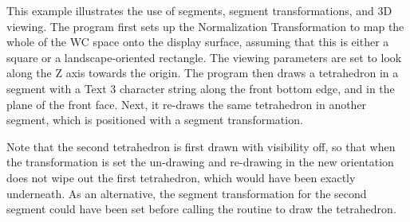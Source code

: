 This example illustrates the use of segments, segment transformations,
and 3D viewing. The program first sets up the Normalization Transformation
to map the whole of the WC space onto the display surface, assuming that
this is either a square or a landscape-oriented rectangle. The viewing
parameters are set to look along the Z axis towards the origin.
The program then draws a tetrahedron in a segment with a Text 3 character
string along the front bottom edge, and in the plane of the front face.
Next, it re-draws the same tetrahedron in another segment,
which is positioned with a segment transformation.
 
Note that the second tetrahedron is first drawn
with visibility off, so that when the transformation is set the
un-drawing and re-drawing in the new orientation does not wipe out
the first tetrahedron, which would have been exactly underneath.
As an alternative, the segment transformation for the second segment
could have been set before calling the routine to draw the tetrahedron.
 
